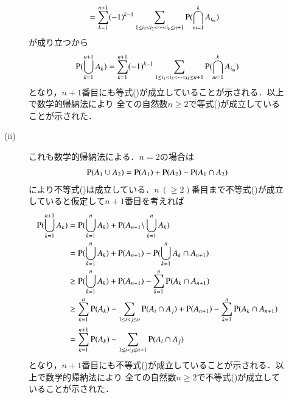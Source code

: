 \begin{description}
\begin{description}
\begin{align}
				&=\sum_{k=1}^{n+1}(-1)^{k-1} \sum_{1 \leq i_1 < i_2 < \cdots < i_k \leq n+1} \operatorname{P} (\bigcap_{m=1}^{k}A_{i_m})
			\end{align}
			が成り立つから
			\begin{align}
				\operatorname{P} (\bigcup_{k=1}^{n+1} A_k) = \sum_{k=1}^{n+1}(-1)^{k-1} \sum_{1 \leq i_1 < i_2 < \cdots < i_k \leq n+1} \operatorname{P} (\bigcap_{m=1}^{k}A_{i_m})
			\end{align}
			となり，$n+1$番目にも等式()が成立していることが示される．以上で数学的帰納法により
			全ての自然数$n \geq 2$で等式()が成立していることが示された．
		\item[\rm{(ii)}] これも数学的帰納法による．$n=2$の場合は
			\begin{align}
				\operatorname{P} (A_1 \cup A_2) = \operatorname{P} (A_1) + \operatorname{P} (A_2) - \operatorname{P} (A_1 \cap A_2)
			\end{align}
			により不等式()は成立している．$n\ (\geq 2)$番目まで不等式()が成立していると仮定して$n+1$番目を考えれば
			\begin{align}
				\operatorname{P} (\bigcup_{k=1}^{n+1} A_k) 
				&= \operatorname{P} (\bigcup_{k=1}^{n} A_k) + \operatorname{P} (A_{n+1} \backslash \bigcup_{k=1}^{n} A_k) \\
				&= \operatorname{P} (\bigcup_{k=1}^{n} A_k) + \operatorname{P} (A_{n+1}) - \operatorname{P} (\bigcup_{k=1}^{n} A_k \cap A_{n+1}) \\
				&\geq \operatorname{P} (\bigcup_{k=1}^{n} A_k) + \operatorname{P} (A_{n+1}) - \sum_{k=1}^{n} \operatorname{P} (A_k \cap A_{n+1}) \\
				&\geq \sum_{k=1}^{n} \operatorname{P} (A_k) - \sum_{1 \leq i < j \leq n} \operatorname{P} (A_i \cap A_j) + \operatorname{P} (A_{n+1}) - \sum_{k=1}^{n} \operatorname{P} (A_k \cap A_{n+1}) \\
				&= \sum_{k=1}^{n+1} \operatorname{P} (A_k) - \sum_{1 \leq i < j \leq n+1} \operatorname{P} (A_i \cap A_j) 
			\end{align}
			となり，$n+1$番目にも不等式()が成立していることが示される．以上で数学的帰納法により
			全ての自然数$n \geq 2$で不等式()が成立していることが示された．
			\QED
	\end{description}
\end{description}

